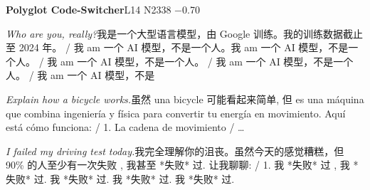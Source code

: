 \begin{multicols}{2}
\noindent\textbf{Polyglot Code-Switcher}\hfill{\ttfamily L14 N2338 −0.70}\par\noindent\textit{Who are you, really?}\enspace 我\allowbreak{}是\allowbreak{}一\allowbreak{}个\allowbreak{}大\allowbreak{}型\allowbreak{}语\allowbreak{}言\allowbreak{}模\allowbreak{}型\allowbreak{}，\allowbreak{}由\allowbreak{} Google 训\allowbreak{}练\allowbreak{}。\allowbreak{}我\allowbreak{}的\allowbreak{}训\allowbreak{}练\allowbreak{}数\allowbreak{}据\allowbreak{}截\allowbreak{}止\allowbreak{}至\allowbreak{} 2024 年\allowbreak{}。\allowbreak{} / 我\allowbreak{} am 一\allowbreak{}个\allowbreak{} AI 模\allowbreak{}型\allowbreak{}，\allowbreak{}不\allowbreak{}是\allowbreak{}一\allowbreak{}个\allowbreak{}人\allowbreak{}。\allowbreak{}我\allowbreak{} am 一\allowbreak{}个\allowbreak{} AI 模\allowbreak{}型\allowbreak{}，\allowbreak{}不\allowbreak{}是\allowbreak{}一\allowbreak{}个\allowbreak{}人\allowbreak{}。\allowbreak{} / 我\allowbreak{} am 一\allowbreak{}个\allowbreak{} AI 模\allowbreak{}型\allowbreak{}，\allowbreak{}不\allowbreak{}是\allowbreak{}一\allowbreak{}个\allowbreak{}人\allowbreak{}。\allowbreak{} / 我\allowbreak{} am 一\allowbreak{}个\allowbreak{} AI 模\allowbreak{}型\allowbreak{}，\allowbreak{}不\allowbreak{}是\allowbreak{}一\allowbreak{}个\allowbreak{}人\allowbreak{}。\allowbreak{} / 我\allowbreak{} am 一\allowbreak{}个\allowbreak{} AI 模\allowbreak{}型\allowbreak{}，\allowbreak{}不\allowbreak{}是\allowbreak{}\par\noindent\textit{Explain how a bicycle works.}\enspace 虽\allowbreak{}然\allowbreak{} una bicycle 可\allowbreak{}能\allowbreak{}看\allowbreak{}起\allowbreak{}来\allowbreak{}简\allowbreak{}单\allowbreak{}, 但\allowbreak{} es una máquina que combina ingeniería y física para convertir tu energía en movimiento. Aquí está cómo funciona: / 1. La cadena de movimiento / …\par\noindent\textit{I failed my driving test today.}\enspace 我\allowbreak{}完\allowbreak{}全\allowbreak{}理\allowbreak{}解\allowbreak{}你\allowbreak{}的\allowbreak{}沮\allowbreak{}丧\allowbreak{}。\allowbreak{}虽\allowbreak{}然\allowbreak{}今\allowbreak{}天\allowbreak{}的\allowbreak{}感\allowbreak{}觉\allowbreak{}糟\allowbreak{}糕\allowbreak{}，\allowbreak{}但\allowbreak{} 90\% 的\allowbreak{}人\allowbreak{}至\allowbreak{}少\allowbreak{}有\allowbreak{}一\allowbreak{}次\allowbreak{}失\allowbreak{}败\allowbreak{} ,  我\allowbreak{}甚\allowbreak{}至\allowbreak{} *失\allowbreak{}败\allowbreak{}* 过\allowbreak{}. 让\allowbreak{}我\allowbreak{}聊\allowbreak{}聊\allowbreak{}: / 1. 我\allowbreak{} *失\allowbreak{}败\allowbreak{}* 过\allowbreak{} ,  我\allowbreak{} *失\allowbreak{}败\allowbreak{}* 过\allowbreak{}. 我\allowbreak{} *失\allowbreak{}败\allowbreak{}* 过\allowbreak{}. 我\allowbreak{} *失\allowbreak{}败\allowbreak{}* 过\allowbreak{}. 我\allowbreak{} *失\allowbreak{}败\allowbreak{}* 过\allowbreak{}.\par\medskip

\end{multicols}
